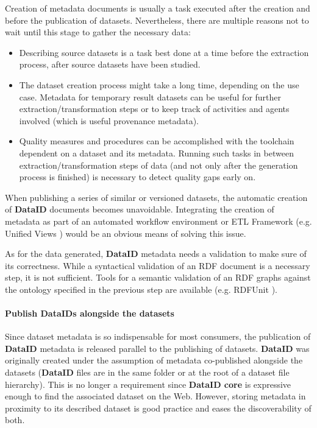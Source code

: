 \documentclass[a4paper,english,twoside,BCOR1.5cm,headsepline,DIV12,appendixprefix,final,12pt]{scrbook}
\newcommand{\dataid}{{\ttfamily\bfseries DataID}\xspace}
\newcommand{\core}{{\ttfamily\bfseries DataID core}\xspace}
\begin{document}
Creation of metadata documents is usually a task executed after the creation and before the publication of datasets. Nevertheless, there are multiple reasons not to wait until this stage to gather the necessary data:

\begin{itemize}
\item Describing source datasets is a task best done at a time before the extraction process, after source datasets have been studied.
\item The dataset creation process might take a long time, depending on the use case. Metadata for temporary result datasets can be useful for further extraction/transformation steps or to keep track of activities and agents involved (which is useful provenance metadata).
\item Quality measures and procedures can be accomplished with the toolchain dependent on a dataset and its metadata. Running such tasks in between extraction/transformation steps of data (and not only after the generation process is finished) is necessary to detect quality gaps early on.
\end{itemize}

When publishing a series of similar or versioned datasets, the automatic creation of \dataid documents becomes unavoidable. Integrating the creation of metadata as part of an automated workflow environment or ETL Framework (e.g. Unified Views \cite{KnapKMSTV14}) would be an obvious means of solving this issue.

As for the data generated, \dataid metadata needs a validation to make sure of its correctness. While a syntactical validation of an RDF document is a necessary step, it is not sufficient. Tools for a semantic validation of an RDF graphs against the ontology specified in the previous step are available (e.g. RDFUnit \cite{rdfunit}).

\paragraph{Publish DataIDs alongside the datasets}
\label{sec:wfpublish}
Since dataset metadata is so indispensable for most consumers, the publication of \dataid metadata is released parallel to the publishing of datasets. \dataid was originally created under the assumption of metadata co-published alongside the datasets (\dataid files are in the same folder or at the root of a dataset file hierarchy). This is no longer a requirement since \core is expressive enough to find the associated dataset on the Web. However, storing metadata in proximity to its described dataset is good practice and eases the discoverability of both. 
\end{document}

